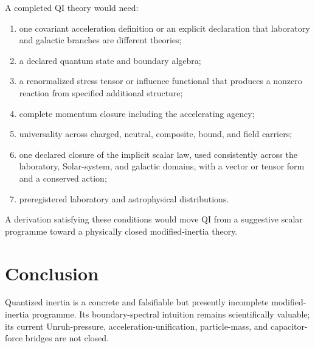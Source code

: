 \documentclass[11pt]{article}
\begin{document}
A completed QI theory would need:
\begin{enumerate}[leftmargin=1.55em]
  \item one covariant acceleration definition or an explicit declaration that laboratory and galactic branches are different theories;
  \item a declared quantum state and boundary algebra;
  \item a renormalized stress tensor or influence functional that produces a nonzero reaction from specified additional structure;
  \item complete momentum closure including the accelerating agency;
  \item universality across charged, neutral, composite, bound, and field carriers;
  \item one declared closure of the implicit scalar law, used consistently across the laboratory, Solar-system, and galactic domains, with a vector or tensor form and a conserved action;
  \item preregistered laboratory and astrophysical distributions.
\end{enumerate}
A derivation satisfying these conditions would move QI from a suggestive scalar programme toward a physically closed modified-inertia theory.

\section{Conclusion}
\label{sec:conclusion}

\begin{tcolorbox}[title=Final classification,colback=white,colframe=black]
Quantized inertia is a concrete and falsifiable but presently incomplete modified-inertia programme. Its boundary-spectral intuition remains scientifically valuable; its current Unruh-pressure, acceleration-unification, particle-mass, and capacitor-force bridges are not closed.
\end{tcolorbox}
\end{document}
